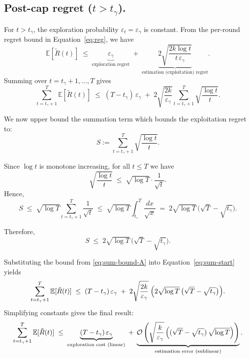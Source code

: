 \documentclass[mksc,nonblindrev]{informs3}
\begin{document}
\begin{APPENDICES}
\subsection{Post-cap regret ($t>t_\gamma$).}
For $t > t_\gamma$, the exploration probability $\varepsilon_t = \varepsilon_\gamma$ is constant. 
From the per-round regret bound in Equation~\eqref{eq:reg}, we have
\[
\mathbb{E}[\tilde R(t)]
\;\le\;
\underbrace{\varepsilon_\gamma}_{\text{exploration regret}}
\;+\;
\underbrace{2\sqrt{\frac{2k\log t}{t\,\varepsilon_\gamma}}}_{\text{estimation (exploitation) regret}}.
\]
Summing over $t = t_\gamma + 1, \dots, T$ gives
\begin{equation}\label{eq:sum-start}
\sum_{t=t_\gamma+1}^{T}\mathbb{E}[\tilde R(t)]
\;\le\;
(T-t_\gamma)\,\varepsilon_\gamma
\;+\;
2\sqrt{\frac{2k}{\varepsilon_\gamma}}
\sum_{t=t_\gamma+1}^{T}\sqrt{\frac{\log t}{t}}.
\end{equation}

\noindent We now upper bound the summation term which bounds the exploitation regret to:
\[
S := \sum_{t=t_\gamma+1}^{T}\sqrt{\frac{\log t}{t}}.
\]

\noindent Since $\log t$ is monotone increasing, for all $t \le T$ we have
\[
\sqrt{\frac{\log t}{t}}
\;\le\;
\sqrt{\log T}\cdot \frac{1}{\sqrt{t}}.
\]
Hence,
\[
S
\;\le\;
\sqrt{\log T}\sum_{t=t_\gamma+1}^{T}\frac{1}{\sqrt{t}}
\;\le\;
\sqrt{\log T}\int_{t_\gamma}^{T}\frac{dx}{\sqrt{x}}
\;=\;
2\sqrt{\log T}\,\big(\sqrt{T}-\sqrt{t_\gamma}\big).
\]

\noindent Therefore,
\begin{equation}\label{eq:sum-bound-A}
S
\;\le\;
2\sqrt{\log T}\,\big(\sqrt{T}-\sqrt{t_\gamma}\big).
\end{equation}


\noindent Substituting the bound from \eqref{eq:sum-bound-A} into
Equation~\eqref{eq:sum-start} yields
\[
\sum_{t=t_\gamma+1}^{T}\mathbb{E}[\tilde R(t)]
\;\le\;
(T-t_\gamma)\,\varepsilon_\gamma
\;+\;
2\sqrt{\frac{2k}{\varepsilon_\gamma}}\;
\Bigl(2\sqrt{\log T}\,\big(\sqrt{T}-\sqrt{t_\gamma}\big)\Bigr).
\]
Simplifying constants gives the final result:
\begin{equation}\label{eq:postcap-proof}
\sum_{t=t_\gamma+1}^{T}\mathbb{E}[\tilde R(t)]
\;\le\;
\underbrace{(T-t_\gamma)\,\varepsilon_\gamma}_{\text{exploration cost (linear)}}
\;+\;
\underbrace{\mathcal{O}\left(\sqrt{\frac{k}{\varepsilon_\gamma}}\,
\Bigl((\sqrt{T}-\sqrt{t_\gamma})\,\sqrt{\log T}\Bigr)\right)}_{\text{estimation error (sublinear)}}.
\end{equation}


\end{APPENDICES}
\end{document}
